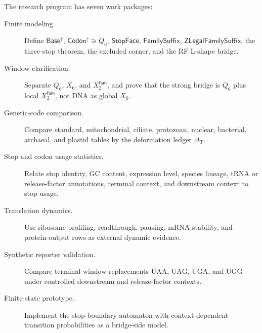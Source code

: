 \begin{definition}
\label{def:philosophy-codon-cube-boundary-work-packages}
The research program has seven work packages:
\begin{description}
  \item[Finite modeling.]
  Define $\mathsf{Base}^{\uparrow}$, $\mathsf{Codon}^{\uparrow}\cong
  Q_{6}$, $\mathsf{StopFace}$, $\mathsf{FamilySuffix}$,
  $\mathsf{ZLegalFamilySuffix}$, the three-stop theorem, the excluded
  corner, and the RF L-shape bridge.

  \item[Window clarification.]
  Separate $Q_{6}$, $X_{6}$, and $X_{2}^{\mathsf{fam}}$, and prove that
  the strong bridge is $Q_{6}$ plus local $X_{2}^{\mathsf{fam}}$, not
  DNA as global $X_{6}$.

  \item[Genetic-code comparison.]
  Compare standard, mitochondrial, ciliate, protozoan, nuclear,
  bacterial, archaeal, and plastid tables by the deformation ledger
  $\Delta_{T}$.

  \item[Stop and codon usage statistics.]
  Relate stop identity, GC content, expression level, species lineage,
  tRNA or release-factor annotations, terminal context, and downstream
  context to stop usage.

  \item[Translation dynamics.]
  Use ribosome-profiling, readthrough, pausing, mRNA stability, and
  protein-output rows as external dynamic evidence.

  \item[Synthetic reporter validation.]
  Compare terminal-window replacements
  $\mathrm{UAA}$, $\mathrm{UAG}$, $\mathrm{UGA}$, and $\mathrm{UGG}$
  under controlled downstream and release-factor contexts.

  \item[Finite-state prototype.]
  Implement the stop-boundary automaton with context-dependent
  transition probabilities as a bridge-side model.
\end{description}
\end{definition}


